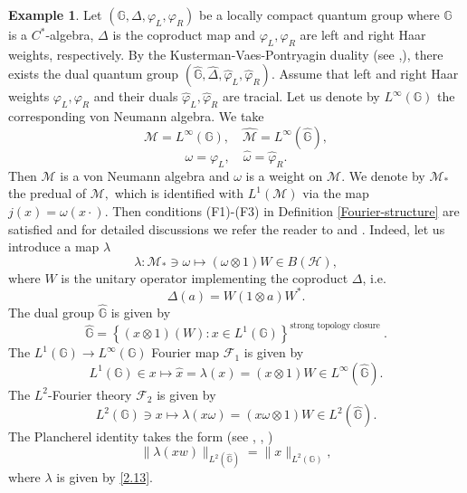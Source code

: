 \documentclass[a4paper,12pt]{amsart}
\numberwithin{equation}{section}
\theoremstyle{definition}
\newtheorem{ex}[thm]{Example}
\begin{document}
\begin{ex} Let $\left(\mathbb{G}, \Delta, \varphi_{L}, \varphi_{R}\right)$ be a locally compact quantum group where $\mathbb{G}$ is a $C^{*}$-algebra, $\Delta$ is the coproduct map and $\varphi_{L}, \varphi_{R}$ are left and right Haar weights, respectively. By the Kusterman-Vaes-Pontryagin duality (see \cite{Cas},\cite{KV}), there exists the dual quantum group $\left(\widehat{\mathbb{G}}, \widehat{\Delta}, \widehat{\varphi}_{L}, \widehat{\varphi}_{R}\right)$. Assume that left and right Haar weights $\varphi_{L}, \varphi_{R}$ and their duals $ \widehat{\varphi}_{L}, \widehat{\varphi}_{R}$ are tracial.  Let us denote by $L^{\infty}(\mathbb{G})$ the corresponding von Neumann algebra. We take
$$
\mathcal{M}=L^{\infty}(\mathbb{G}), \quad \widehat{\mathcal{M}} =L^{\infty}(\widehat{\mathbb{G}}), $$
$$
\omega =\varphi_{L}, \quad \widehat{\omega}=\widehat{\varphi}_{R}.
$$
Then $\mathcal{M}$ is a von Neumann algebra and $\omega$ is a weight on $\mathcal{M}$. We denote by $\mathcal{M}_{*}$ the predual of $\mathcal{M},$ which is identified with $L^1(\mathcal{M})$ via the map
$j(x)=\omega(x\cdot).$
Then conditions (F1)-(F3) in Definition \ref{Fourier-structure} are satisfied and for detailed discussions we refer the reader to \cite[Theorem 5.2]{Cas} and \cite[Section 3.2]{Z}.
Indeed, let us introduce a map $\lambda$
\begin{equation}\label{2.13}
\lambda: \mathcal{M}_{*} \ni \omega \mapsto(\omega \otimes 1) W \in B(\mathcal{H}),
\end{equation}
where $W$ is the unitary operator implementing the coproduct $\Delta$, i.e.
$$
\Delta(a)=W(1 \otimes a) W^{*}.
$$
The dual group $\widehat{\mathbb{G}}$ is given by
$$
\widehat{\mathbb{G}}=\left\{(x \otimes 1)(W): x \in L^{1}(\mathbb{G})\right\}^{\text {strong topology closure }}.
$$
The $L^{1}(\mathbb{G}) \to L^{\infty}(\mathbb{G})$ Fourier map $\mathcal{F}_1$ is given by
\begin{equation*}
L^{1}(\mathbb{G}) \in x \mapsto \widehat{x}=\lambda(x)=(x \otimes 1) W \in L^{\infty}(\widehat{\mathbb{G}}).
\end{equation*}
The $L^{2}$-Fourier theory $\mathcal{F}_2$ is given by
$$
L^{2}(\mathbb{G}) \ni x \mapsto \lambda(x \omega)=(x \omega \otimes 1) W \in L^{2}(\widehat{\mathbb{G}}).
$$
The Plancherel identity takes the form (see \cite[Theorem 5.2]{Cas}, \cite[Theorem 2.3.11]{Tim08}, \cite{Z})
\begin{equation*}
\|\lambda(x w)\|_{L^{2}(\widehat{\mathbb{G}})}=\|x\|_{L^{2}(\mathbb{G})},
\end{equation*}
where $\lambda$ is given by \eqref{2.13}.
\end{ex}
\end{document}
